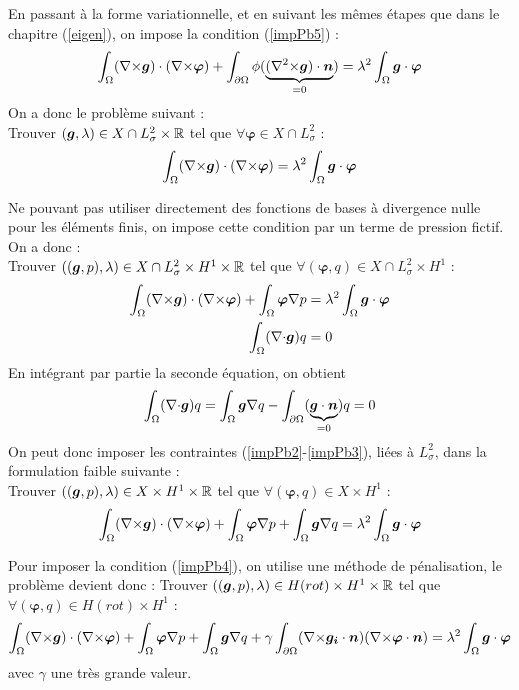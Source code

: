 En passant à la forme variationnelle, et en suivant les mêmes étapes que dans le chapitre (\ref{eigen}), on impose la condition (\ref{impPb5}) :
\[ \int_\Omega ({\nabla\times}\bm{g})\cdot({\nabla\times}\bm{\varphi}) + \int_{\partial\Omega} \phi(\underbrace{({\nabla^2\times} \bm{g})\cdot\bm{n}}_{=0})= \lambda^2\int_\Omega \bm{g}\cdot\bm{\varphi} \]
On a donc le problème suivant :\\
Trouver $(\bm{g},\lambda)\in X\cap L^2_\sigma\times{\mathbb{R}}$ tel que $\forall \bm{\varphi}\in X\cap L^2_\sigma$ :
\[ \int_\Omega ({\nabla\times}\bm{g})\cdot({\nabla\times}\bm{\varphi}) = \lambda^2\int_\Omega \bm{g}\cdot\bm{\varphi} \]

Ne pouvant pas utiliser directement des fonctions de bases à divergence nulle pour les éléments finis, on impose cette condition par un terme de pression fictif. On a donc :\\
Trouver $((\bm{g},p),\lambda)\in X\cap L^2_\sigma \times H^1 \times {\mathbb{R}}$ tel que $\forall (\bm{\varphi},q)\in X\cap L^2_\sigma \times H^1$ :
\begin{align*}
\int_\Omega ({\nabla\times}\bm{g})\cdot({\nabla\times}\bm{\varphi}) + \int_\Omega\bm{\varphi}{\nabla} p &= \lambda^2\int_\Omega \bm{g}\cdot\bm{\varphi}\\
\int_\Omega ({\nabla\cdot}\bm{g}) q &= 0
\end{align*}
En intégrant par partie la seconde équation, on obtient
\[ \int_\Omega ({\nabla\cdot}\bm{g}) q = \int_\Omega \bm{g}{\nabla} q - \int_{\partial\Omega} (\underbrace{\bm{g}\cdot \bm{n}}_{=0})q = 0 \]
On peut donc imposer les contraintes (\ref{impPb2}-\ref{impPb3}), liées à $L^2_\sigma$, dans la formulation faible suivante :\\
Trouver $((\bm{g},p),\lambda)\in X \times H^1 \times {\mathbb{R}}$ tel que $\forall (\bm{\varphi},q)\in X \times H^1$ :
\[ \int_\Omega ({\nabla\times}\bm{g})\cdot({\nabla\times}\bm{\varphi}) + \int_\Omega\bm{\varphi}{\nabla} p + \int_\Omega \bm{g}{\nabla} q = \lambda^2\int_\Omega \bm{g}\cdot\bm{\varphi} \]

Pour imposer la condition (\ref{impPb4}), on utilise une méthode de pénalisation, le problème devient donc :
Trouver $((\bm{g},p),\lambda)\in H(rot) \times H^1 \times {\mathbb{R}}$ tel que $\forall (\bm{\varphi},q)\in H(rot) \times H^1$ :
\begin{equation}\label{impFvEigen}
\int_\Omega ({\nabla\times}\bm{g})\cdot({\nabla\times}\bm{\varphi}) + \int_\Omega\bm{\varphi}{\nabla} p + \int_\Omega \bm{g}{\nabla} q + \gamma\int_{\partial\Omega}({\nabla\times}\bm{g_i}\cdot\bm{n})({\nabla\times}\bm{\varphi}\cdot\bm{n}) = \lambda^2\int_\Omega \bm{g}\cdot\bm{\varphi}
\end{equation}
avec $\gamma$ une très grande valeur.\\


